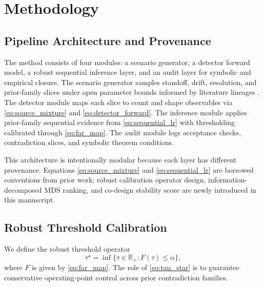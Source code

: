 \documentclass{article} %
\begin{document}
\section{Methodology}\label{sec:method}
\subsection{Pipeline Architecture and Provenance}
The method consists of four modules: a scenario generator, a detector forward model, a robust sequential inference layer, and an audit layer for symbolic and empirical closure. The scenario generator samples standoff, drift, resolution, and prior-family slices under open parameter bounds informed by literature lineages \citep{SRC007,SRC010,SRC019,SRC025,SRC026,SRC028}. The detector module maps each slice to count and shape observables via \eqref{eq:source_mixture} and \eqref{eq:detector_forward}. The inference module applies prior-family sequential evidence from \eqref{eq:sequential_lr} with thresholding calibrated through \eqref{eq:far_map}. The audit module logs acceptance checks, contradiction slices, and symbolic theorem conditions.

This architecture is intentionally modular because each layer has different provenance. Equations \eqref{eq:source_mixture} and \eqref{eq:sequential_lr} are borrowed conventions from prior work; robust calibration operator design, information-decomposed MDS ranking, and co-design stability score are newly introduced in this manuscript.

\subsection{Robust Threshold Calibration}
We define the robust threshold operator
\begin{equation}
\tau^\star = \inf\{\tau\in\mathbb{R}_+: F(\tau)\le \alpha\},
\label{eq:tau_star}
\end{equation}
where $F$ is given by \eqref{eq:far_map}. The role of \eqref{eq:tau_star} is to guarantee conservative operating-point control across prior contradiction families.
\end{document}
